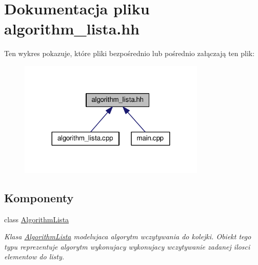 \hypertarget{algorithm__lista_8hh}{\section{Dokumentacja pliku algorithm\-\_\-lista.\-hh}
\label{algorithm__lista_8hh}
}
Ten wykres pokazuje, które pliki bezpośrednio lub pośrednio załączają ten plik\-:\nopagebreak
\begin{figure}[H]
\begin{center}
\leavevmode
\includegraphics[width=252pt]{algorithm__lista_8hh__dep__incl}
\end{center}
\end{figure}
\subsection*{Komponenty}
\begin{DoxyCompactItemize}
\item 
class \hyperlink{class_algorithm_lista}{Algorithm\-Lista}
\begin{DoxyCompactList}\small\item\em Klasa \hyperlink{class_algorithm_lista}{Algorithm\-Lista} modelujaca algorytm wczytywania do kolejki. Obiekt tego typu reprezentuje algorytm wykonujacy wykonujacy wczytywanie zadanej ilosci elementow do listy. \end{DoxyCompactList}\end{DoxyCompactItemize}
